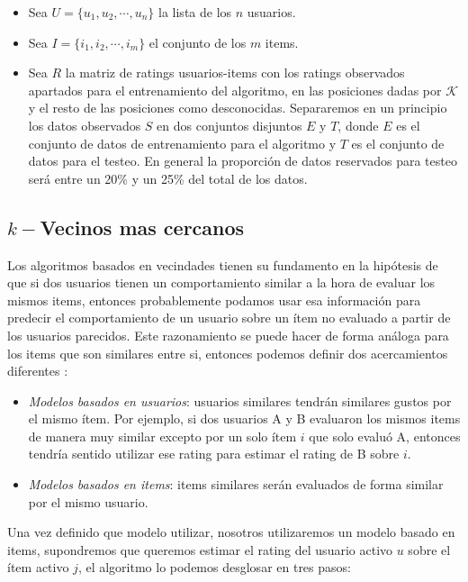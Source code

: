 \documentclass[hidelinks,12pt,a4paper]{book}
\theoremstyle{plain}
\theoremstyle{definition}
\begin{document}
\begin{itemize}
\item Sea ${U}=\{u_1,u_2,\cdots,u_n\}$  la lista de los $n$ usuarios.
\item Sea ${I}=\{i_1,i_2,\cdots,i_m\}$  el conjunto de los $m$ items.
\item Sea $R$ la matriz de ratings usuarios-items con los ratings observados apartados para el entrenamiento del algoritmo, en las posiciones dadas por $\mathcal{K}$ y el resto de las posiciones como desconocidas. Separaremos en un principio los datos observados $S$ en dos conjuntos disjuntos $E$ y $T$, donde $E$ es el conjunto de datos de entrenamiento para el algoritmo y $T$ es el conjunto de datos para el testeo. En general la proporción de datos reservados para testeo será entre un 20\% y un 25\% del total de los datos.
\end{itemize}


\subsection{\texorpdfstring{$k-$}-Vecinos mas cercanos}

Los algoritmos basados en vecindades tienen su fundamento en la hipótesis de que si dos usuarios tienen un comportamiento similar a la hora de evaluar los mismos items, entonces probablemente podamos usar esa información para predecir el comportamiento de un usuario sobre un ítem no evaluado a partir de los usuarios parecidos. Este razonamiento se puede hacer de forma análoga para los items que son similares entre si, entonces podemos definir dos acercamientos diferentes \cite{neighbordsurvey}:

\begin{itemize}
\item \textit{Modelos basados en usuarios}: usuarios similares tendrán similares gustos por el mismo ítem. Por ejemplo, si dos usuarios A y B evaluaron los mismos items de manera muy similar excepto por un solo ítem $i$ que solo evaluó A, entonces tendría sentido utilizar ese rating para estimar el rating de B sobre $i$.
\item \textit{Modelos basados en items}: items similares serán evaluados de forma similar por el mismo usuario.
\end{itemize}

Una vez definido que modelo utilizar, nosotros utilizaremos un modelo basado en items, supondremos que queremos estimar el rating del usuario activo $u$ sobre el ítem activo $j$, el algoritmo lo podemos desglosar en tres pasos\cite{herlocker1999algorithmic}:
\end{document}
